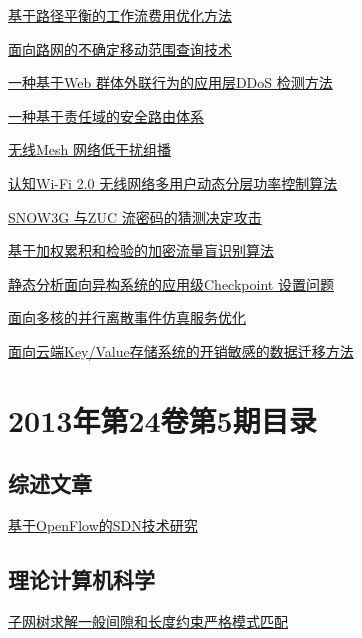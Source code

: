 \documentclass[a4paper]{article}
\begin{document}
\href{http://www.jos.org.cn/ch/reader/download_pdf.aspx?file_no=4259&year_id=2013&quarter_id=6&falg=1}{基于路径平衡的工作流费用优化方法}

\href{http://www.jos.org.cn/ch/reader/download_pdf.aspx?file_no=4320&year_id=2013&quarter_id=6&falg=1}{面向路网的不确定移动范围查询技术}

\href{http://www.jos.org.cn/ch/reader/download_pdf.aspx?file_no=4274&year_id=2013&quarter_id=6&falg=1}{一种基于Web 群体外联行为的应用层DDoS 检测方法}

\href{http://www.jos.org.cn/ch/reader/download_pdf.aspx?file_no=4284&year_id=2013&quarter_id=6&falg=1}{一种基于责任域的安全路由体系}

\href{http://www.jos.org.cn/ch/reader/download_pdf.aspx?file_no=4291&year_id=2013&quarter_id=6&falg=1}{无线Mesh 网络低干扰组播}

\href{http://www.jos.org.cn/ch/reader/download_pdf.aspx?file_no=4313&year_id=2013&quarter_id=6&falg=1}{认知Wi-Fi 2.0 无线网络多用户动态分层功率控制算法}

\href{http://www.jos.org.cn/ch/reader/download_pdf.aspx?file_no=4287&year_id=2013&quarter_id=6&falg=1}{SNOW3G 与ZUC 流密码的猜测决定攻击}

\href{http://www.jos.org.cn/ch/reader/download_pdf.aspx?file_no=4279&year_id=2013&quarter_id=6&falg=1}{基于加权累积和检验的加密流量盲识别算法}

\href{http://www.jos.org.cn/ch/reader/download_pdf.aspx?file_no=4325&year_id=2013&quarter_id=6&falg=1}{静态分析面向异构系统的应用级Checkpoint 设置问题}

\href{http://www.jos.org.cn/ch/reader/download_pdf.aspx?file_no=4280&year_id=2013&quarter_id=6&falg=1}{面向多核的并行离散事件仿真服务优化}

\href{http://www.jos.org.cn/ch/reader/download_pdf.aspx?file_no=4352&year_id=2013&quarter_id=6&falg=1}{面向云端Key/Value存储系统的开销敏感的数据迁移方法}


\section{\textbf{2013年第24卷第5期目录}}
\subsection{综述文章}
\href{http://www.jos.org.cn/ch/reader/download_pdf.aspx?file_no=4390&year_id=2013&quarter_id=5&falg=1}{基于OpenFlow的SDN技术研究}

\subsection{理论计算机科学}
\href{http://www.jos.org.cn/ch/reader/download_pdf.aspx?file_no=4381&year_id=2013&quarter_id=5&falg=1}{子网树求解一般间隙和长度约束严格模式匹配}
\end{document}
